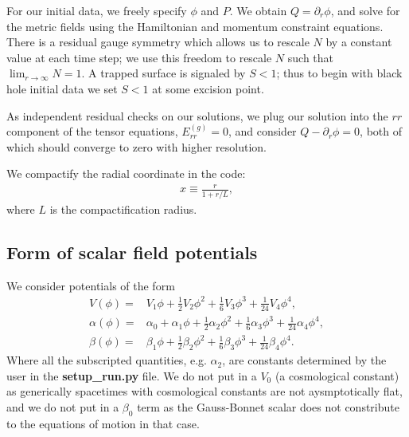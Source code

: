 \documentclass[a4paper,11pt]{article}
\begin{document}
   For our initial data, we freely specify $\phi$ and $P$.
We obtain $Q=\partial_r\phi$, and solve for the metric fields using
the Hamiltonian and momentum constraint equations.
There is a residual gauge symmetry which allows us
to rescale $N$ by a constant value at each time step;
we use this freedom to rescale $N$ such
that $\lim_{r\to\infty}N=1$.
A trapped surface is signaled by $S<1$;
thus to begin with black hole initial data we set $S<1$ at some
excision point.

   As independent residual checks on our solutions, we plug our
solution into the $rr$ component of the tensor equations, $E^{(g)}_{rr}=0$,
and consider $Q-\partial_r\phi=0$, both of which should converge
to zero with higher resolution.

   We compactify the radial coordinate in the code:
\begin{align}
   x
   \equiv
   \frac{r}{1+r/L}
   ,
\end{align}
   where $L$ is the compactification radius.
\subsection{Form of scalar field potentials}
   We consider potentials of the form
\begin{subequations}
\begin{align}
   V\left(\phi\right)
   =&
   V_1\phi
+  \frac{1}{2}V_2\phi^2
+  \frac{1}{6}V_3\phi^3
+  \frac{1}{24}V_4\phi^4
   ,\\
   \alpha\left(\phi\right)
   =&
   \alpha_0
+  \alpha_1\phi
+  \frac{1}{2}\alpha_2\phi^2
+  \frac{1}{6}\alpha_3\phi^3
+  \frac{1}{24}\alpha_4\phi^4
   ,\\
   \beta\left(\phi\right)
   =&
   \beta_1\phi
+  \frac{1}{2}\beta_2\phi^2
+  \frac{1}{6}\beta_3\phi^3
+  \frac{1}{24}\beta_4\phi^4
   .
\end{align}
\end{subequations}
   Where all the subscripted quantities, e.g. $\alpha_2$, are constants
determined by the user in the {\bf setup\_run.py} file.
We do not put in a $V_0$ (a cosmological constant) as generically
spacetimes with cosmological constants are not aysmptotically flat,
and we do not put in a $\beta_0$ term as the Gauss-Bonnet scalar
does not constribute to the equations of motion in that case.






\end{document}
